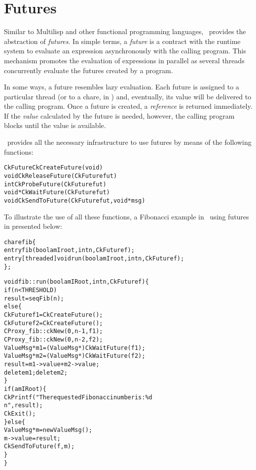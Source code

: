 \section{Futures}
\label{futures}

Similar to Multilisp and other functional programming languages, \charmpp\
provides the abstraction of {\em futures}. In simple terms, a {\em future} is a
contract with the runtime system to evaluate an expression asynchronously with
the calling program. This mechanism promotes the evaluation of expressions in
parallel as several threads concurrently evaluate the futures created by a
program.

In some ways, a future resembles lazy evaluation. Each future is assigned to a
particular thread (or to a chare, in \charmpp) and, eventually, its value will
be delivered to the calling program. Once a future is created, a {\em
reference} is returned immediately. If the {\em value} calculated by the future
is needed, however, the calling program blocks until the value is available.

\charmpp\ provides all the necessary infrastructure to use futures by means of
the following functions: 

\begin{alltt}
 CkFuture CkCreateFuture(void)
 void CkReleaseFuture(CkFuture fut)
 int CkProbeFuture(CkFuture fut)
 void *CkWaitFuture(CkFuture fut)
 void  CkSendToFuture(CkFuture fut, void *msg)
\end{alltt}

To illustrate the use of all these functions, a Fibonacci example in \charmpp\
using futures in presented below:

\begin{alltt}
chare fib \{
  entry fib(bool amIroot, int n, CkFuture f);
  entry  [threaded] void run(bool amIroot, int n, CkFuture f);
\};
\end{alltt}

\begin{alltt}
void  fib::run(bool amIRoot, int n, CkFuture f) \{
   if (n < THRESHOLD)
    result = seqFib(n);
  else \{
    CkFuture f1 = CkCreateFuture();
    CkFuture f2 = CkCreateFuture();
    CProxy_fib::ckNew(0, n-1, f1);
    CProxy_fib::ckNew(0, n-2, f2);
    ValueMsg * m1 = (ValueMsg *) CkWaitFuture(f1);
    ValueMsg * m2 = (ValueMsg *) CkWaitFuture(f2);
    result = m1->value + m2->value;
    delete m1; delete m2;
  \}
  if (amIRoot) \{
    CkPrintf("The requested Fibonacci number is : \%d\\n", result);
    CkExit();  
  \} else \{
    ValueMsg *m = new ValueMsg();
    m->value = result;
    CkSendToFuture(f, m); 
  \}
\}
\end{alltt}

